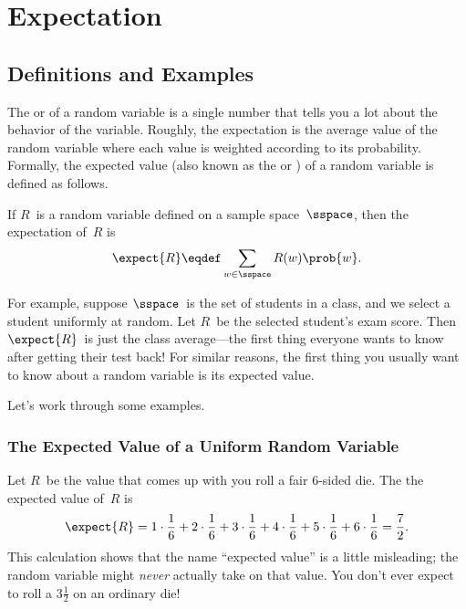 \chapter{Expectation}\label{chap:expectation}

\begin{problems}
\classproblems
{}

\end{problems}

\section{Definitions and Examples}

The  or  of a random variable
is a single number that tells you a lot about the behavior of the
variable.  Roughly, the expectation is the average value of the random
variable where each value is weighted according to its probability.
Formally, the expected value (also known as the  or
) of a random variable is defined as follows.

\begin{definition}\label{def:expectation}
If $R$~is a random variable defined on a sample space~$\sspace$, then
the expectation of~$R$ is
\begin{equation}\label{eqn:expectation}
    \expect{R} \eqdef \sum_{w \in \sspace} R(w) \prob{w}.
\end{equation}
\end{definition}

For example, suppose $\sspace$~is the set of students in a class, and
we select a student uniformly at random.  Let $R$~be the selected
student's exam score.  Then $\expect{R}$~is just the class
average---the first thing everyone wants to know after getting their
test back!  For similar reasons, the first thing you usually want to
know about a random variable is its expected value.

Let's work through some examples.

\subsection{The Expected Value of a Uniform Random Variable}

Let $R$~be the value that comes up with you roll a fair 6-sided die.
The the expected value of~$R$ is
\begin{equation*}
\expect{R}
     = 1 \cdot \frac{1}{6} + 2 \cdot \frac{1}{6} + 3 \cdot \frac{1}{6} +
        4 \cdot \frac{1}{6} + 5 \cdot \frac{1}{6} + 6 \cdot \frac{1}{6}
     = \frac{7}{2}.
\end{equation*}
%
This calculation shows that the name ``expected value'' is a little
misleading; the random variable might \emph{never} actually take on that
value.  You don't ever expect to roll a $3 \frac{1}{2}$ on an ordinary
die!

